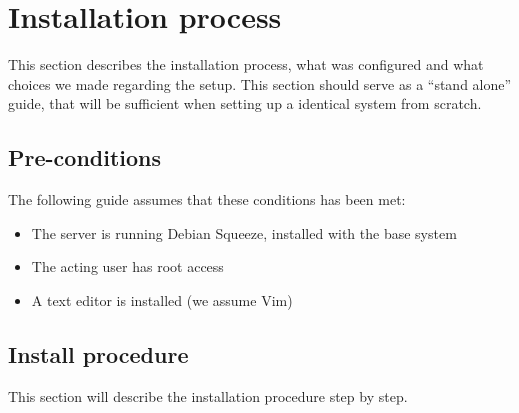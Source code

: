\section{Installation process}
This section describes the installation process, what was configured and
what choices we made regarding the setup. This section should serve as a
``stand alone'' guide, that will be sufficient when setting up a
identical system from scratch.
\subsection{Pre-conditions}
The following guide assumes that these conditions has been met:
\begin{itemize}
	\item The server is running Debian Squeeze, installed with the base
system
	\item The acting user has root access
	\item A text editor is installed (we assume Vim)
\end{itemize}
\subsection{Install procedure}
This section will describe the installation procedure step by step.
